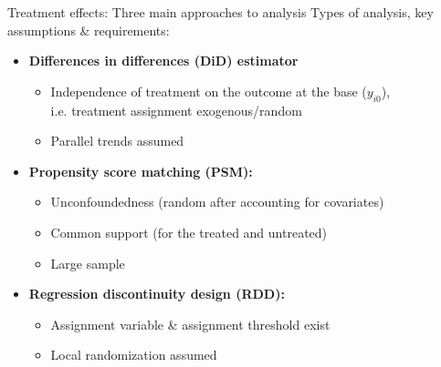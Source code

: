 \documentclass{beamer}
\begin{document}
\begin{frame}{Treatment effects: Three main approaches to analysis}
Types of analysis, key assumptions \& requirements:\\
\bigskip
\begin{itemize}
    \item \textbf{Differences in differences (DiD) estimator}\\
        \begin{itemize}
            \item Independence of treatment on the outcome at the base ($y_{i0}$), \\i.e. treatment assignment exogenous/random
            \item Parallel trends assumed
        \end{itemize}
    \bigskip
    \item \textbf{Propensity score matching (PSM):}
        \begin{itemize}
            \item Unconfoundedness (random after accounting for covariates)
            \item Common support (for the treated and untreated)
            \item Large sample 
        \end{itemize}
    \bigskip
    \item \textbf{Regression discontinuity design (RDD):}
        \begin{itemize}
            \item Assignment variable \& assignment threshold exist
            \item Local randomization assumed
        \end{itemize}
\end{itemize}
\end{frame}
\end{document}
